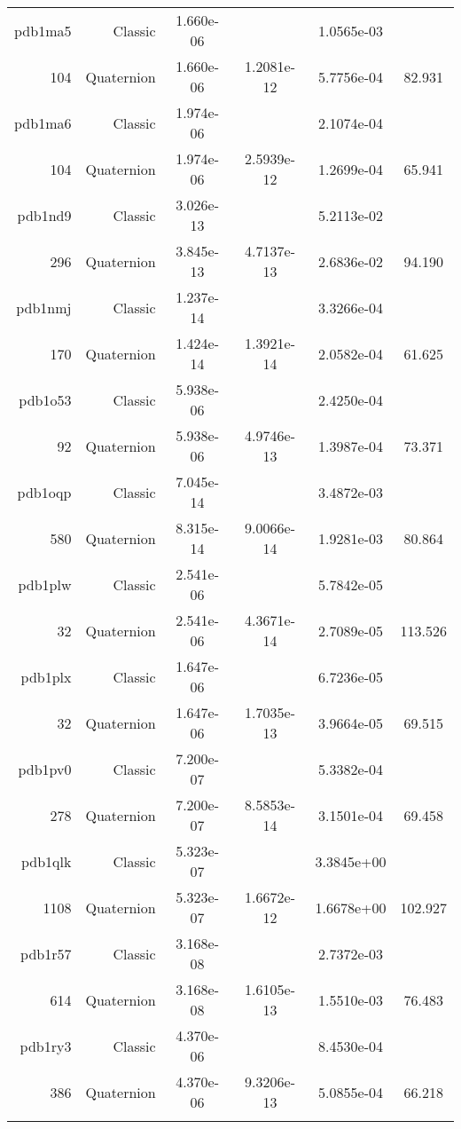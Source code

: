\begin{xltabular}{\textwidth}{r|rS[table-format=1.3e+2]S[table-format=1.4e+2]S[table-format=1.4e+2]S[table-format=-1.3]}
pdb1ma5 & Classic & 1.660e-06 &  & 1.0565e-03 & \\
104 & Quaternion & 1.660e-06 & 1.2081e-12 & 5.7756e-04 & 82.931\\  \addlinespace
pdb1ma6 & Classic & 1.974e-06 &  & 2.1074e-04 & \\
104 & Quaternion & 1.974e-06 & 2.5939e-12 & 1.2699e-04 & 65.941\\  \addlinespace
pdb1nd9 & Classic & 3.026e-13 &  & 5.2113e-02 & \\
296 & Quaternion & 3.845e-13 & 4.7137e-13 & 2.6836e-02 & 94.190\\  \addlinespace
pdb1nmj & Classic & 1.237e-14 &  & 3.3266e-04 & \\
170 & Quaternion & 1.424e-14 & 1.3921e-14 & 2.0582e-04 & 61.625\\  \addlinespace
pdb1o53 & Classic & 5.938e-06 &  & 2.4250e-04 & \\
92 & Quaternion & 5.938e-06 & 4.9746e-13 & 1.3987e-04 & 73.371\\  \addlinespace
pdb1oqp & Classic & 7.045e-14 &  & 3.4872e-03 & \\
580 & Quaternion & 8.315e-14 & 9.0066e-14 & 1.9281e-03 & 80.864\\  \addlinespace
pdb1plw & Classic & 2.541e-06 &  & 5.7842e-05 & \\
32 & Quaternion & 2.541e-06 & 4.3671e-14 & 2.7089e-05 & 113.526\\  \addlinespace
pdb1plx & Classic & 1.647e-06 &  & 6.7236e-05 & \\
32 & Quaternion & 1.647e-06 & 1.7035e-13 & 3.9664e-05 & 69.515\\  \addlinespace
pdb1pv0 & Classic & 7.200e-07 &  & 5.3382e-04 & \\
278 & Quaternion & 7.200e-07 & 8.5853e-14 & 3.1501e-04 & 69.458\\  \addlinespace
pdb1qlk & Classic & 5.323e-07 &  & 3.3845e+00 & \\
1108 & Quaternion & 5.323e-07 & 1.6672e-12 & 1.6678e+00 & 102.927\\  \addlinespace
pdb1r57 & Classic & 3.168e-08 &  & 2.7372e-03 & \\
614 & Quaternion & 3.168e-08 & 1.6105e-13 & 1.5510e-03 & 76.483\\  \addlinespace
pdb1ry3 & Classic & 4.370e-06 &  & 8.4530e-04 & \\
386 & Quaternion & 4.370e-06 & 9.3206e-13 & 5.0855e-04 & 66.218\\  \addlinespace

\end{xltabular}
